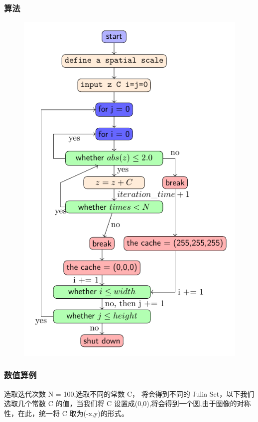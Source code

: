 \documentclass{beamer}
\begin{document}
\begin{frame}
  \frametitle{算法}
  \begin{figure}
    \centering
    \includegraphics[scale=0.5]{julia.pdf}
  \end{figure}
\end{frame}

\begin{frame}
  \frametitle{数值算例}
  选取迭代次数 N = 100,选取不同的常数 C， 将会得到不同的 Julia Set，以下我们选取几个常数 C 的值，当我们将 C 设置成(0,0),将会得到一个圆,由于图像的对称性，在此，统一将 C 取为(-x,y)的形式。
  \begin{figure}[H]
    \centering
  \end{figure}
  \begin{figure}[H]
    \centering
  \end{figure}
\end{frame}
\end{document}
